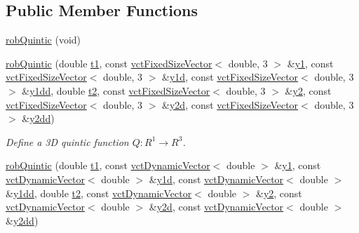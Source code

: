 \subsection*{Public Member Functions}
\begin{DoxyCompactItemize}
\item 
\hyperlink{classrob_quintic_a365fcae26cb823aabc52a8d55ef3e35f}{rob\+Quintic} (void)
\item 
\hyperlink{classrob_quintic_a6930cf8723c0f010ae52b0874655ec8f}{rob\+Quintic} (double \hyperlink{classrob_function_a9a4b408a3a5a8ae927caec3b6bac36ef}{t1}, const \hyperlink{classvct_fixed_size_vector}{vct\+Fixed\+Size\+Vector}$<$ double, 3 $>$ \&\hyperlink{classrob_function_rn_aadf26230a697fedca000dac29ae27129}{y1}, const \hyperlink{classvct_fixed_size_vector}{vct\+Fixed\+Size\+Vector}$<$ double, 3 $>$ \&\hyperlink{classrob_function_rn_a0cd776a1eec33965d8cdce69c7c12902}{y1d}, const \hyperlink{classvct_fixed_size_vector}{vct\+Fixed\+Size\+Vector}$<$ double, 3 $>$ \&\hyperlink{classrob_function_rn_a44e2cfac47df0d9324c0d7d6251d680f}{y1dd}, double \hyperlink{classrob_function_abf15c2d695ab4cc6336e19862327858f}{t2}, const \hyperlink{classvct_fixed_size_vector}{vct\+Fixed\+Size\+Vector}$<$ double, 3 $>$ \&\hyperlink{classrob_function_rn_a982a35e7e6f235da34765d3ceeb91109}{y2}, const \hyperlink{classvct_fixed_size_vector}{vct\+Fixed\+Size\+Vector}$<$ double, 3 $>$ \&\hyperlink{classrob_function_rn_a99d86533626d78aa644816936ec01ac2}{y2d}, const \hyperlink{classvct_fixed_size_vector}{vct\+Fixed\+Size\+Vector}$<$ double, 3 $>$ \&\hyperlink{classrob_function_rn_af67e2c772c0550231dd2b768adbae702}{y2dd})
\begin{DoxyCompactList}\small\item\em Define a 3\+D quintic function $Q: R^1\rightarrow R^3 $. \end{DoxyCompactList}\item 
\hyperlink{classrob_quintic_ad93d9a12bde9bfe35d48afb86c41980d}{rob\+Quintic} (double \hyperlink{classrob_function_a9a4b408a3a5a8ae927caec3b6bac36ef}{t1}, const \hyperlink{classvct_dynamic_vector}{vct\+Dynamic\+Vector}$<$ double $>$ \&\hyperlink{classrob_function_rn_aadf26230a697fedca000dac29ae27129}{y1}, const \hyperlink{classvct_dynamic_vector}{vct\+Dynamic\+Vector}$<$ double $>$ \&\hyperlink{classrob_function_rn_a0cd776a1eec33965d8cdce69c7c12902}{y1d}, const \hyperlink{classvct_dynamic_vector}{vct\+Dynamic\+Vector}$<$ double $>$ \&\hyperlink{classrob_function_rn_a44e2cfac47df0d9324c0d7d6251d680f}{y1dd}, double \hyperlink{classrob_function_abf15c2d695ab4cc6336e19862327858f}{t2}, const \hyperlink{classvct_dynamic_vector}{vct\+Dynamic\+Vector}$<$ double $>$ \&\hyperlink{classrob_function_rn_a982a35e7e6f235da34765d3ceeb91109}{y2}, const \hyperlink{classvct_dynamic_vector}{vct\+Dynamic\+Vector}$<$ double $>$ \&\hyperlink{classrob_function_rn_a99d86533626d78aa644816936ec01ac2}{y2d}, const \hyperlink{classvct_dynamic_vector}{vct\+Dynamic\+Vector}$<$ double $>$ \&\hyperlink{classrob_function_rn_af67e2c772c0550231dd2b768adbae702}{y2dd})

\end{DoxyCompactItemize}
